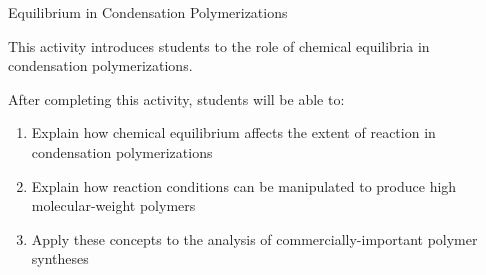 %
%
%
%

\renewcommand{\figpath}{content/polymchem/stepgrowth/condensation-equilibria/figs}
\renewcommand{\labelbase}{condequilib}

\begin{activity}{Equilibrium in Condensation Polymerizations}

\begin{instructornotes}

	This activity introduces students to the role of chemical equilibria in condensation polymerizations.
	
	After completing this activity, students will be able to:
			\begin{enumerate}
				\item Explain how chemical equilibrium affects the extent of reaction in condensation polymerizations
				\item Explain how reaction conditions can be manipulated to produce high molecular-weight polymers
				\item Apply these concepts to the analysis of commercially-important polymer syntheses
			\end{enumerate}
	
			

\end{instructornotes}
\end{activity}
